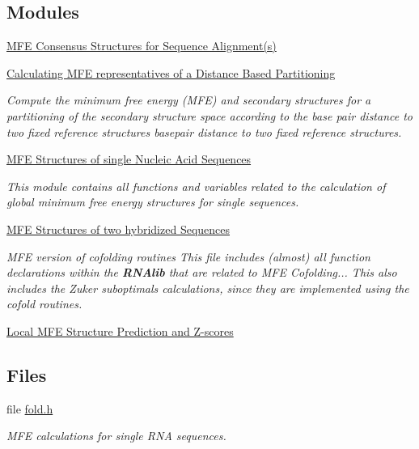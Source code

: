 \subsection*{Modules}
\begin{DoxyCompactItemize}
\item 
\hyperlink{group__consensus__mfe__fold}{M\+F\+E Consensus Structures for Sequence Alignment(s)}
\item 
\hyperlink{group__kl__neighborhood__mfe}{Calculating M\+F\+E representatives of a Distance Based Partitioning}
\begin{DoxyCompactList}\small\item\em Compute the minimum free energy (M\+FE) and secondary structures for a partitioning of the secondary structure space according to the base pair distance to two fixed reference structures basepair distance to two fixed reference structures. \end{DoxyCompactList}\item 
\hyperlink{group__mfe__fold__single}{M\+F\+E Structures of single Nucleic Acid Sequences}
\begin{DoxyCompactList}\small\item\em This module contains all functions and variables related to the calculation of global minimum free energy structures for single sequences. \end{DoxyCompactList}\item 
\hyperlink{group__mfe__cofold}{M\+F\+E Structures of two hybridized Sequences}
\begin{DoxyCompactList}\small\item\em M\+FE version of cofolding routines This file includes (almost) all function declarations within the {\bfseries R\+N\+Alib} that are related to M\+FE Cofolding... This also includes the Zuker suboptimals calculations, since they are implemented using the cofold routines. \end{DoxyCompactList}\item 
\hyperlink{group__local__mfe__fold}{Local M\+F\+E Structure Prediction and Z-\/scores}
\end{DoxyCompactItemize}
\subsection*{Files}
\begin{DoxyCompactItemize}
\item 
file \hyperlink{fold_8h}{fold.\+h}
\begin{DoxyCompactList}\small\item\em M\+FE calculations for single R\+NA sequences. \end{DoxyCompactList}\end{DoxyCompactItemize}
